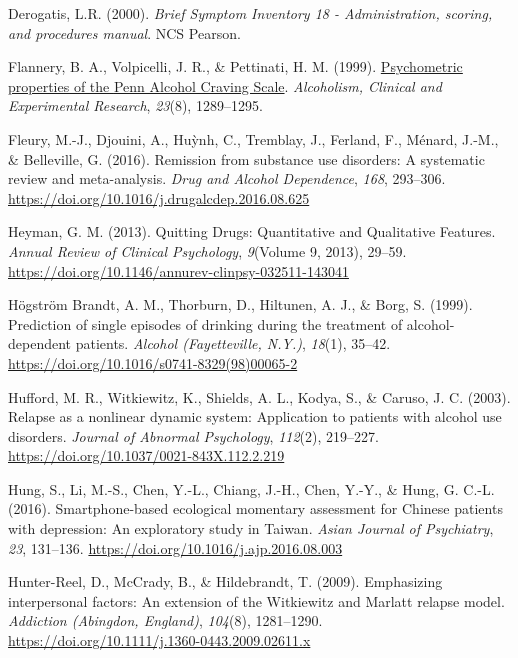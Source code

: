 \documentclass[
  letterpaper,
  DIV=11,
  numbers=noendperiod]{scrartcl}
\newlength{\cslhangindent}
\newenvironment{CSLReferences}[2] %
 {\begin{list}{}{%
  \setlength{\itemindent}{0pt}
  \setlength{\leftmargin}{0pt}
  \setlength{\parsep}{0pt}
  \ifodd #1
   \setlength{\leftmargin}{\cslhangindent}
   \setlength{\itemindent}{-1\cslhangindent}
  \fi
  \setlength{\itemsep}{#2\baselineskip}}}
 {\end{list}}
\begin{document}
\begin{CSLReferences}{1}{0}
Derogatis, L.R. (2000). \emph{Brief {Symptom Inventory} 18 -
{Administration}, scoring, and procedures manual}. NCS Pearson.

Flannery, B. A., Volpicelli, J. R., \& Pettinati, H. M. (1999).
\href{https://www.ncbi.nlm.nih.gov/pubmed/10470970}{Psychometric
properties of the {Penn Alcohol Craving Scale}}. \emph{Alcoholism,
Clinical and Experimental Research}, \emph{23}(8), 1289--1295.

Fleury, M.-J., Djouini, A., Huỳnh, C., Tremblay, J., Ferland, F.,
Ménard, J.-M., \& Belleville, G. (2016). Remission from substance use
disorders: {A} systematic review and meta-analysis. \emph{Drug and
Alcohol Dependence}, \emph{168}, 293--306.
\url{https://doi.org/10.1016/j.drugalcdep.2016.08.625}

Heyman, G. M. (2013). Quitting {Drugs}: {Quantitative} and {Qualitative
Features}. \emph{Annual Review of Clinical Psychology}, \emph{9}(Volume
9, 2013), 29--59.
\url{https://doi.org/10.1146/annurev-clinpsy-032511-143041}

Högström Brandt, A. M., Thorburn, D., Hiltunen, A. J., \& Borg, S.
(1999). Prediction of single episodes of drinking during the treatment
of alcohol-dependent patients. \emph{Alcohol (Fayetteville, N.Y.)},
\emph{18}(1), 35--42.
\url{https://doi.org/10.1016/s0741-8329(98)00065-2}

Hufford, M. R., Witkiewitz, K., Shields, A. L., Kodya, S., \& Caruso, J.
C. (2003). Relapse as a nonlinear dynamic system: {Application} to
patients with alcohol use disorders. \emph{Journal of Abnormal
Psychology}, \emph{112}(2), 219--227.
\url{https://doi.org/10.1037/0021-843X.112.2.219}

Hung, S., Li, M.-S., Chen, Y.-L., Chiang, J.-H., Chen, Y.-Y., \& Hung,
G. C.-L. (2016). Smartphone-based ecological momentary assessment for
{Chinese} patients with depression: {An} exploratory study in {Taiwan}.
\emph{Asian Journal of Psychiatry}, \emph{23}, 131--136.
\url{https://doi.org/10.1016/j.ajp.2016.08.003}

Hunter-Reel, D., McCrady, B., \& Hildebrandt, T. (2009). Emphasizing
interpersonal factors: {An} extension of the {Witkiewitz} and {Marlatt}
relapse model. \emph{Addiction (Abingdon, England)}, \emph{104}(8),
1281--1290. \url{https://doi.org/10.1111/j.1360-0443.2009.02611.x}


\end{CSLReferences}
\end{document}
